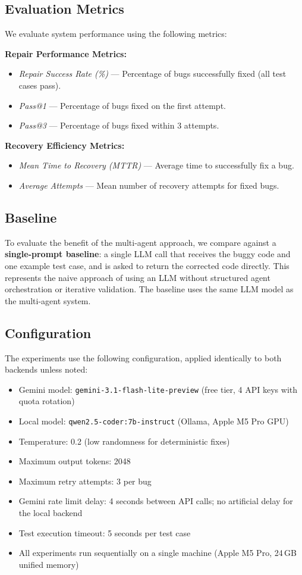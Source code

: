 \documentclass[conference]{IEEEtran}
\begin{document}
\subsection{Evaluation Metrics}
We evaluate system performance using the following metrics:

\textbf{Repair Performance Metrics:}
\begin{itemize}
    \item \textit{Repair Success Rate (\%)} --- Percentage of bugs successfully fixed (all test cases pass).
    \item \textit{Pass@1} --- Percentage of bugs fixed on the first attempt.
    \item \textit{Pass@3} --- Percentage of bugs fixed within 3 attempts.
\end{itemize}

\textbf{Recovery Efficiency Metrics:}
\begin{itemize}
    \item \textit{Mean Time to Recovery (MTTR)} --- Average time to successfully fix a bug.
    \item \textit{Average Attempts} --- Mean number of recovery attempts for fixed bugs.
\end{itemize}

\subsection{Baseline}
To evaluate the benefit of the multi-agent approach, we compare against a \textbf{single-prompt baseline}: a single LLM call that receives the buggy code and one example test case, and is asked to return the corrected code directly. This represents the naive approach of using an LLM without structured agent orchestration or iterative validation. The baseline uses the same LLM model as the multi-agent system.

\subsection{Configuration}
The experiments use the following configuration, applied identically to both backends unless noted:
\begin{itemize}
    \item Gemini model: \texttt{gemini-3.1-flash-lite-preview} (free tier, 4 API keys with quota rotation)
    \item Local model: \texttt{qwen2.5-coder:7b-instruct} (Ollama, Apple M5 Pro GPU)
    \item Temperature: 0.2 (low randomness for deterministic fixes)
    \item Maximum output tokens: 2048
    \item Maximum retry attempts: 3 per bug
    \item Gemini rate limit delay: 4 seconds between API calls; no artificial delay for the local backend
    \item Test execution timeout: 5 seconds per test case
    \item All experiments run sequentially on a single machine (Apple M5 Pro, 24\,GB unified memory)
\end{itemize}
\end{document}

